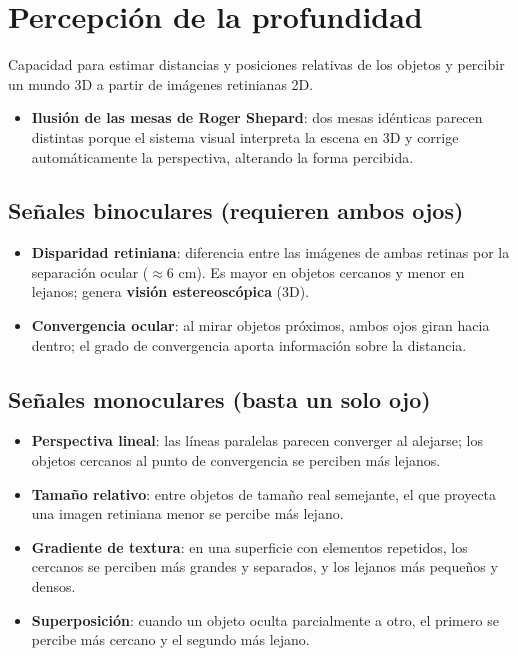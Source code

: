 \documentclass[11pt,a4paper]{article}
\begin{document}
\section{Percepción de la profundidad}

Capacidad para estimar distancias y posiciones relativas de los objetos y percibir un mundo 3D a partir de imágenes retinianas 2D.

\begin{itemize}
  \item \textbf{Ilusión de las mesas de Roger Shepard}: dos mesas idénticas parecen distintas porque el sistema visual interpreta la escena en 3D y corrige automáticamente la perspectiva, alterando la forma percibida.
\end{itemize}

\subsection*{Señales binoculares (requieren ambos ojos)}
\begin{itemize}
  \item \textbf{Disparidad retiniana}: diferencia entre las imágenes de ambas retinas por la separación ocular ($\approx 6\text{ cm}$). Es mayor en objetos cercanos y menor en lejanos; genera \textbf{visión estereoscópica} (3D).
  \item \textbf{Convergencia ocular}: al mirar objetos próximos, ambos ojos giran hacia dentro; el grado de convergencia aporta información sobre la distancia.
\end{itemize}

\subsection*{Señales monoculares (basta un solo ojo)}
\begin{itemize}
  \item \textbf{Perspectiva lineal}: las líneas paralelas parecen converger al alejarse; los objetos cercanos al punto de convergencia se perciben más lejanos.
  \item \textbf{Tamaño relativo}: entre objetos de tamaño real semejante, el que proyecta una imagen retiniana menor se percibe más lejano.
  \item \textbf{Gradiente de textura}: en una superficie con elementos repetidos, los cercanos se perciben más grandes y separados, y los lejanos más pequeños y densos.
  \item \textbf{Superposición}: cuando un objeto oculta parcialmente a otro, el primero se percibe más cercano y el segundo más lejano.
\end{itemize}
\end{document}

